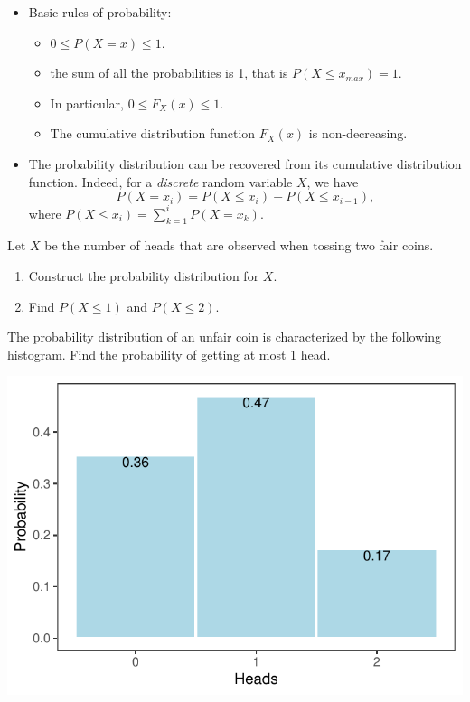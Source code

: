 \begin{itemize}
\item
  Basic rules of probability:

  \begin{itemize}
  \item
    \(0\leq P(X=x)\leq 1\).
  \item
    the sum of all the probabilities is 1, that is
    \(P(X\leq x_{max})=1\).
  \item
    In particular, \(0\leq F_X(x)\leq 1\).
  \item
    The cumulative distribution function \(F_X(x)\) is non-decreasing.
  \end{itemize}
\item
  The probability distribution can be recovered from its cumulative
  distribution function. Indeed, for a \emph{discrete} random variable
  \(X\), we have \[P(X=x_i)=P(X\le x_i)-P(X\le x_{i-1}),\] where
  \(P(X\le x_i)=\sum\limits_{k=1}^i P(X=x_k)\).
\end{itemize}

\begin{example}

Let \(X\) be the number of heads that are observed when tossing two fair
coins.

\begin{enumerate}
\item
  Construct the probability distribution for \(X\).
\item
  Find \(P(X\le 1)\) and \(P(X\le 2)\).
\end{enumerate}

\end{example}

\begin{example}

The probability distribution of an unfair coin is characterized by the
following histogram. Find the probability of getting at most 1 head.

\includegraphics[width=\textwidth]{figure-latex/unnamed-chunk-7-2-1}

\end{example}

